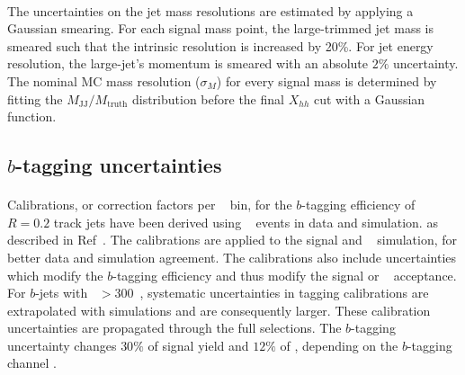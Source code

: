 \paragraph{}
The uncertainties on the jet mass resolutions are estimated by applying a Gaussian smearing.
For each signal mass point, the large-\R trimmed jet mass is smeared such that the intrinsic resolution is increased by 20\%. 
For jet energy resolution, the large-\R jet's momentum is smeared with an absolute $2\%$ uncertainty. 
The nominal MC mass resolution ($\sigma_{M}$) for every signal mass is determined by fitting the $M_\text{JJ} / M_\text{truth}$ distribution before the final $X_{hh}$ cut with a Gaussian function.


\subsection{$b$-tagging uncertainties}
\label{sec:b-tagging-unc}
\paragraph{}
Calibrations, or correction factors per \pt~ bin, for the $b$-tagging efficiency of $R=0.2$ track jets have been derived using \ttbar~ events in data and simulation. as described in Ref~\cite{Aad:2015ydr, ATL-COM-PHYS-2015-009, ATL-COM-PHYS-2015-1323}.
The calibrations are applied to the signal and \ttbar~ simulation, for better data and simulation agreement.  
The calibrations also include uncertainties which modify the $b$-tagging efficiency and thus modify the signal or \ttbar~ acceptance.
For $b$-jets with \pt~$> 300$~\GeV, systematic uncertainties in tagging calibrations are extrapolated with simulations and are consequently larger.
These calibration uncertainties are propagated through the full selections.
The $b$-tagging uncertainty changes $30\%$ of signal yield and $12\%$ of \ttbar, depending on the $b$-tagging channel .

